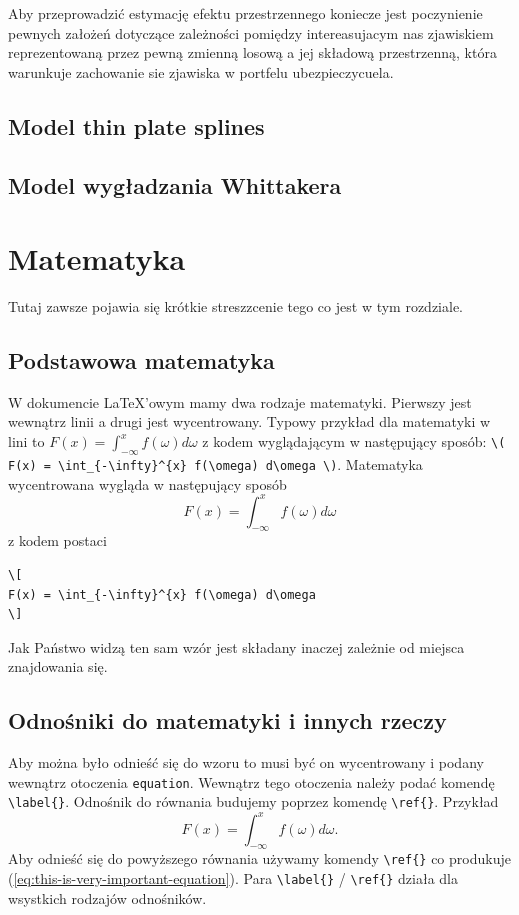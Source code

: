 \documentclass[polish, twoside, 12pt, a4paper]{article}
\theoremstyle{definition}
\theoremstyle{plain}
\theoremstyle{remark}
\begin{document}
Aby przeprowadzić estymację efektu przestrzennego  koniecze jest poczynienie pewnych założeń dotyczące zależności pomiędzy intereasujacym nas zjawiskiem  reprezentowaną przez pewną zmienną losową a jej składową przestrzenną, która warunkuje zachowanie sie zjawiska w portfelu ubezpieczycuela.


\subsection{Model thin plate splines}


\subsection{Model wygładzania Whittakera}



\clearpage
\section{Matematyka}

Tutaj zawsze pojawia się krótkie streszzcenie tego co jest w tym rozdziale.

\subsection{Podstawowa matematyka}




W dokumencie \LaTeX'owym mamy dwa rodzaje matematyki. Pierwszy jest wewnątrz linii a drugi jest wycentrowany. Typowy przykład dla matematyki w lini to  \( F(x) = \int_{-\infty}^{x} f(\omega) d\omega \) z kodem wyglądającym w następujący sposób: \verb!\( F(x) = \int_{-\infty}^{x} f(\omega) d\omega \)!. Matematyka wycentrowana wygląda w następujący sposób
\[
F(x) = \int_{-\infty}^{x} f(\omega) d\omega
\]
z kodem postaci
\begin{verbatim}
\[
F(x) = \int_{-\infty}^{x} f(\omega) d\omega
\]
\end{verbatim}
Jak Państwo widzą ten sam wzór jest składany inaczej zależnie od miejsca znajdowania się.

\subsection{Odnośniki do matematyki i innych rzeczy}

Aby można było odnieść się do wzoru to musi być on wycentrowany i podany wewnątrz otoczenia \verb+equation+. Wewnątrz tego otoczenia należy podać komendę \verb+\label{}+. Odnośnik do równania budujemy poprzez komendę \verb+\ref{}+. Przykład
\begin{equation}
\label{eq:this-is-very-important-equation}
F(x) = \int_{-\infty}^{x} f(\omega) d\omega.
\end{equation}
Aby odnieść się do powyższego równania używamy komendy \verb+\ref{}+ co produkuje (\ref{eq:this-is-very-important-equation}). Para \verb+\label{}+ / \verb+\ref{}+ działa dla wsystkich rodzajów odnośników.
\end{document}

